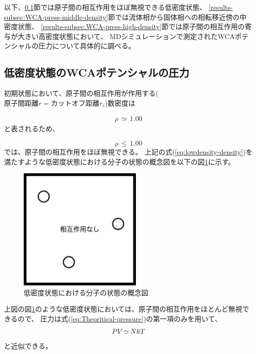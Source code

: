 \documentclass[titlepage]{jsreport}
\begin{document}
{{{以下、\ref{results-subsec:WCA-press-low-density}節では原子間の相互作用をほぼ無視できる低密度状態、
\ref{results-subsec:WCA-press-middle-density}節では流体相から固体相への相転移近傍の中密度状態、
\ref{results-subsec:WCA-press-high-density}節では原子間の相互作用の寄与が大きい高密度状態において、
MDシミュレーションで測定されたWCAポテンシャルの圧力について具体的に調べる。


\subsection{低密度状態のWCAポテンシャルの圧力}\label{results-subsec:WCA-press-low-density}
初期状態において、原子間の相互作用が作用する($原子間距離r=カットオフ距離r_c$)数密度は

\large
\begin{eqnarray}
\rho\,{\simeq}\,1.00 \nonumber
\end{eqnarray}
\normalsize
と表されるため、

\large
\begin{equation}
\rho\,{\leq}\,1.00 \label{eq:lowdensity-density}
\end{equation}
\normalsize
では、原子間の相互作用をほぼ無視できる。
上記の式(\ref{eq:lowdensity-density})を満たすような低密度状態における分子の状態の概念図を以下の図\ref{fig:lowdensity.png}に示す。

\begin{figure}[htbp]
    \begin{center}
        \includegraphics[width=6cm]{fig/lowdensity.png}
    \end{center}
    \caption{低密度状態における分子の状態の概念図}
    \label{fig:lowdensity.png}
\end{figure}

上図の図\ref{fig:lowdensity.png}のような低密度状態においては、原子間の相互作用をほとんど無視できるので、
圧力は式(\ref{eq:Theoritical-pressure})の第一項のみを用いて、
\large
\begin{equation}
PV\,{\simeq}\,NkT{\label{eq:ideal-gas}}
\end{equation}
\normalsize
と近似できる。


}}}
\end{document}
